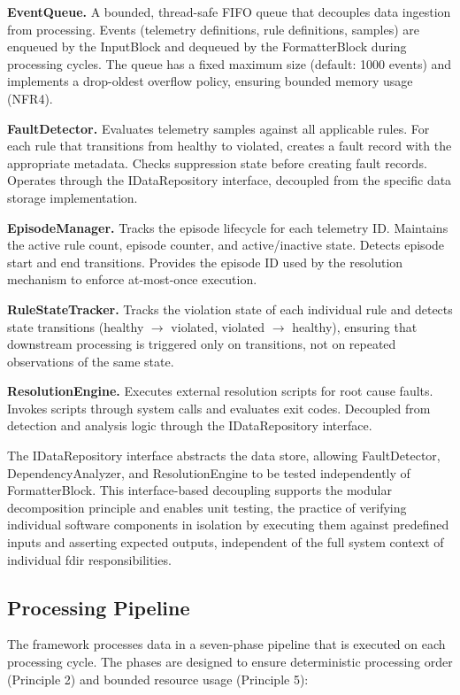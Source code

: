 \textbf{EventQueue.}  
A bounded, thread-safe FIFO queue that decouples data ingestion from processing. Events (telemetry definitions, rule definitions, samples) are enqueued by the InputBlock and dequeued by the FormatterBlock during processing cycles. The queue has a fixed maximum size (default: 1000 events) and implements a drop-oldest overflow policy, ensuring bounded memory usage (NFR4).

\textbf{FaultDetector.}  
Evaluates telemetry samples against all applicable rules. For each rule that transitions from healthy to violated, creates a fault record with the appropriate metadata. Checks suppression state before creating fault records. Operates through the IDataRepository interface, decoupled from the specific data storage implementation.

\textbf{EpisodeManager.}  
Tracks the episode lifecycle for each telemetry ID. Maintains the active rule count, episode counter, and active/inactive state. Detects episode start and end transitions. Provides the episode ID used by the resolution mechanism to enforce at-most-once execution.

\textbf{RuleStateTracker.}  
Tracks the violation state of each individual rule and detects state transitions (healthy $\rightarrow$ violated, violated $\rightarrow$ healthy), ensuring that downstream processing is triggered only on transitions, not on repeated observations of the same state.

\textbf{ResolutionEngine.}  
Executes external resolution scripts for root cause faults. Invokes scripts through system calls and evaluates exit codes. Decoupled from detection and analysis logic through the IDataRepository interface.

The IDataRepository interface abstracts the data store, allowing FaultDetector, DependencyAnalyzer, and ResolutionEngine to be tested independently of FormatterBlock. This interface-based decoupling supports the modular decomposition principle and enables unit testing, the practice of verifying individual software components in isolation by executing them against predefined inputs and asserting expected outputs, independent of the full system context of individual \gls{fdir} responsibilities.


\subsection{Processing Pipeline}\label{sec:processing-pipeline}

The framework processes data in a seven-phase pipeline that is executed on each processing cycle. The phases are designed to ensure deterministic processing order (Principle 2) and bounded resource usage (Principle 5):

